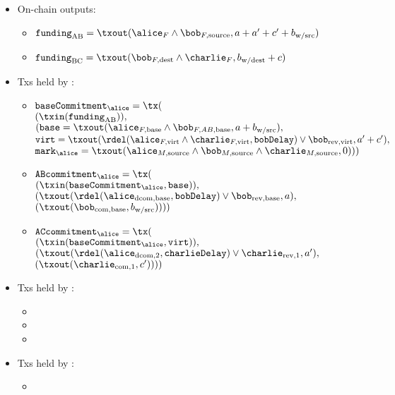   \begin{itemize}
    \item On-chain outputs:
    \begin{itemize}
      \item $\mathtt{funding}_{\mathrm{AB}} = \txout(\alice_{F} \wedge
      \bob_{F, \mathrm{source}}, a + a' + c' + b_{\mathrm{w/src}})$
      \item $\mathtt{funding}_{\mathrm{BC}} = \txout(\bob_{F, \mathrm{dest}}
      \wedge \charlie_{F}, b_{\mathrm{w/dest}} + c)$
    \end{itemize}
    \item Txs held by \alice:
    \begin{itemize}
      \item $\mathtt{baseCommitment}_{\alice} = \tx($ \\
        $(\txin(\mathtt{funding}_{\mathrm{AB}})),$ \\
        $(\mathtt{base} = \txout(\alice_{F, \mathrm{base}} \wedge \bob_{F, AB,
        \mathrm{base}}, a + b_{\mathrm{w/src}}),$ \\
        $\mathtt{virt} = \txout(\rdel(\alice_{F, \mathrm{virt}} \wedge
        \charlie_{F, \mathrm{virt}}, \mathtt{bobDelay}) \vee \\
        \bob_{\mathrm{rev}, \mathrm{virt}}, a' + c'),$ \\
        $\mathtt{mark}_{\alice} = \txout(\alice_{M, \mathrm{source}} \wedge
        \bob_{M, \mathrm{source}} \wedge \charlie_{M, \mathrm{source}}, 0)))$
      \item $\mathtt{ABcommitment}_{\alice} = \tx($ \\
        $(\txin(\mathtt{baseCommitment}_{\alice}, \mathtt{base})),$  \\
        $(\txout(\rdel(\alice_{\mathrm{dcom}, \mathrm{base}}, \mathtt{bobDelay})
        \vee \bob_{\mathrm{rev}, \mathrm{base}}, a),$ \\
        $(\txout(\bob_{\mathrm{com}, \mathrm{base}}, b_{\mathrm{w/src}}))))$
      \item $\mathtt{ACcommitment}_{\alice} = \tx($ \\
        $(\txin(\mathtt{baseCommitment}_{\alice}, \mathtt{virt})),$ \\
        $(\txout(\rdel(\alice_{\mathrm{dcom}, 2}, \mathtt{charlieDelay}) \vee
        \charlie_{\mathrm{rev}, 1}, a'),$ \\
        $(\txout(\charlie_{\mathrm{com}, 1}, c'))))$
    \end{itemize}
    \item Txs held by \bob:
    \begin{itemize}
      \item
      \item
      \item
    \end{itemize}
    \item Txs held by \charlie:
    \begin{itemize}
      \item
    \end{itemize}
  \end{itemize}
